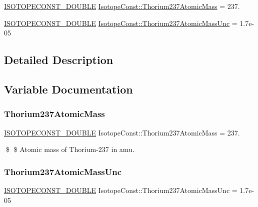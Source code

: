 \begin{DoxyCompactItemize}
\item 
\mbox{\hyperlink{group___isotope_const-_macros_ga8f45a7272ce02c0b4c65c44636ed719a}{I\+S\+O\+T\+O\+P\+E\+C\+O\+N\+S\+T\+\_\+\+D\+O\+U\+B\+LE}} \mbox{\hyperlink{group___isotope_const-_thorium-_th237_gafaf16758fa77e8bdef4123483598af8b}{Isotope\+Const\+::\+Thorium237\+Atomic\+Mass}} = 237.
\item 
\mbox{\hyperlink{group___isotope_const-_macros_ga8f45a7272ce02c0b4c65c44636ed719a}{I\+S\+O\+T\+O\+P\+E\+C\+O\+N\+S\+T\+\_\+\+D\+O\+U\+B\+LE}} \mbox{\hyperlink{group___isotope_const-_thorium-_th237_gab4a574bf55de2e26cf42a6e70cd67b81}{Isotope\+Const\+::\+Thorium237\+Atomic\+Mass\+Unc}} = 1.\+7e-\/05
\end{DoxyCompactItemize}


\subsection{Detailed Description}


\subsection{Variable Documentation}
\mbox{\label{group___isotope_const-_thorium-_th237_gafaf16758fa77e8bdef4123483598af8b}} 
\subsubsection{\texorpdfstring{Thorium237\+Atomic\+Mass}{Thorium237AtomicMass}}
{\footnotesize\ttfamily \mbox{\hyperlink{group___isotope_const-_macros_ga8f45a7272ce02c0b4c65c44636ed719a}{I\+S\+O\+T\+O\+P\+E\+C\+O\+N\+S\+T\+\_\+\+D\+O\+U\+B\+LE}} Isotope\+Const\+::\+Thorium237\+Atomic\+Mass = 237.}

\$ \$ Atomic mass of Thorium-\/237 in amu. \mbox{\label{group___isotope_const-_thorium-_th237_gab4a574bf55de2e26cf42a6e70cd67b81}} 
\subsubsection{\texorpdfstring{Thorium237\+Atomic\+Mass\+Unc}{Thorium237AtomicMassUnc}}
{\footnotesize\ttfamily \mbox{\hyperlink{group___isotope_const-_macros_ga8f45a7272ce02c0b4c65c44636ed719a}{I\+S\+O\+T\+O\+P\+E\+C\+O\+N\+S\+T\+\_\+\+D\+O\+U\+B\+LE}} Isotope\+Const\+::\+Thorium237\+Atomic\+Mass\+Unc = 1.\+7e-\/05}

